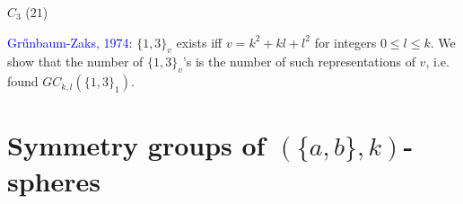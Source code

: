 \documentclass{beamer}
\begin{document}
\begin{frame}
\begin{center}
\begin{minipage}[b]{25mm}
\par
$C_{3}$  ($21$)
\end{minipage} 
\end{center}


\textcolor{blue}{Gr\H{u}nbaum-Zaks, 1974}: $\{1,3\}_v$ exists iff
$v=k^2+kl+l^2$ for integers $0\le l\le k$.
We show that the
number of
  $\{1,3\}_v$'s is the number  of such representations of $v$, i.e.
found
 $GC_{k,l}(\{1,3\}_1)$.
\end{frame}




\section[]{Symmetry groups of $(\{a,b\},k)$-spheres}

\end{document}
